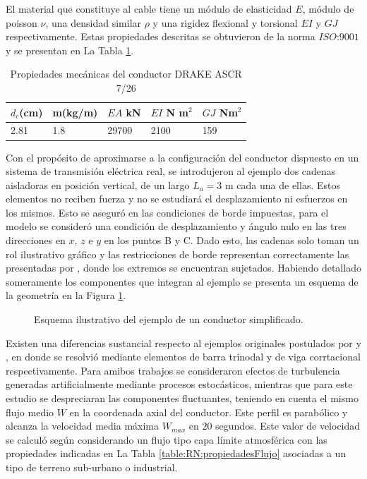 El material que constituye al cable tiene un módulo de elasticidad $E$, módulo de poisson $\nu$, una densidad similar $\rho$ y una rigidez flexional y torsional $EI$ y $GJ$ respectivamente. Estas propiedades descritas se obtuvieron de la norma $\textit{ISO:9001}$ y se presentan en La Tabla \ref{table:RN:FotiCable:propiedadesCable}.

\begin{table}[ht!]\label{table:RN:FotiCable:propiedadesCable}
	\begin{center}
		\begin{tabular}{ | m{2cm} | m{2cm} | m{2cm} | m{2cm} |  m{2cm} | }
			\hline $d_c$(cm) & m(kg/m)& $EA$ kN& $EI$ N m$^2$& $GJ$ Nm$^2$  \\ \hline
			2.81 & 1.8 & 29700 &2100 &159   \\ \hline
		\end{tabular}
	\end{center}
	\caption{Propiedades mecánicas del conductor DRAKE ASCR 7/26 }
\end{table}

Con el propósito de aproximarse a la configuración del conductor dispuesto en un sistema de transmisión eléctrica real, se introdujeron al ejemplo dos cadenas aisladoras en posición vertical, de un largo $L_a=3$ m cada una de ellas. Estos elementos no reciben fuerza y no se estudiará el desplazamiento ni esfuerzos en los mismos. Esto se aseguró en las condiciones de borde impuestas, para el modelo se consideró una condición de desplazamiento y ángulo nulo en las tres direcciones en $x$, $z$ e $y$ en los puntos $\text{B}$ y $\text{C}$. Dado esto, las cadenas solo toman un rol ilustrativo gráfico y las restricciones de borde representan correctamente las presentadas por \textcite{foti2018finite}, donde los extremos se encuentran sujetados. Habiendo detallado someramente los componentes que integran al ejemplo se presenta un esquema de la geometría  en la Figura \ref{fig:RN:FotiCable:Ilustracion}.

\begin{figure}[htbp]
	\centering
	\def\svgwidth{80mm}
	
	\caption{Esquema ilustrativo del ejemplo de un conductor simplificado.}
	\label{fig:RN:FotiCable:Ilustracion}
\end{figure}

 Existen una diferencias sustancial respecto al ejemplos originales postulados por \textcite{luongo1998non} y \textcite{martinelli2001numerical}, en donde se resolvió mediante elementos de barra trinodal y de viga corrtacional respectivamente. Para amibos trabajos se consideraron efectos de turbulencia generadas artificialmente mediante procesos estocásticos, mientras que para este estudio se despreciaran las componentes fluctuantes, teniendo en cuenta el mismo flujo medio $W$  en la coordenada axial del conductor. Este perfil es parabólico y alcanza la velocidad media máxima $W_{max}$ en $20$ segundos. Este valor de velocidad se calculó según \cite{euroCode} considerando un flujo tipo capa límite atmosférica con las propiedades indicadas en La Tabla \ref{table:RN:propiedadesFlujo} asociadas a un tipo de terreno sub-urbano o industrial.


